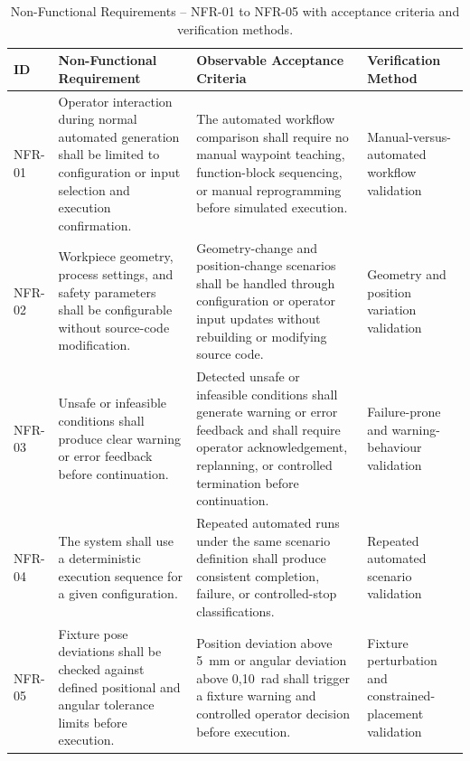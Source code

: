 ﻿\begin{table}[htbp]
\centering

\setlength{\tabcolsep}{3pt}
\renewcommand{\arraystretch}{1.0}

\begin{tabularx}{\textwidth}{
L{1.3cm}
L{5.8cm}
L{4.4cm}
L{3.1cm}
}

\hline
\textbf{ID} &
\textbf{Non-Functional Requirement} &
\textbf{Observable Acceptance Criteria} &
\textbf{Verification Method} \\
\hline

NFR-01 &
Operator interaction during normal automated generation shall be limited to configuration or input selection and execution confirmation. &
The automated workflow comparison shall require no manual waypoint teaching, function-block sequencing, or manual reprogramming before simulated execution. &
Manual-versus-automated workflow validation \\

\hline

NFR-02 &
Workpiece geometry, process settings, and safety parameters shall be configurable without source-code modification. &
Geometry-change and position-change scenarios shall be handled through configuration or operator input updates without rebuilding or modifying source code. &
Geometry and position variation validation \\

\hline

NFR-03 &
Unsafe or infeasible conditions shall produce clear warning or error feedback before continuation. &
Detected unsafe or infeasible conditions shall generate warning or error feedback and shall require operator acknowledgement, replanning, or controlled termination before continuation. &
Failure-prone and warning-behaviour validation \\

\hline

NFR-04 &
The system shall use a deterministic execution sequence for a given configuration. &
Repeated automated runs under the same scenario definition shall produce consistent completion, failure, or controlled-stop classifications. &
Repeated automated scenario validation \\

\hline

NFR-05 &
Fixture pose deviations shall be checked against defined positional and angular tolerance limits before execution. &
Position deviation above 5~mm or angular deviation above 0{,}10~rad shall trigger a fixture warning and controlled operator decision before execution. &
Fixture perturbation and constrained-placement validation \\

\hline
\end{tabularx}

\caption{Non-Functional Requirements -- NFR-01 to NFR-05 with acceptance criteria and verification methods.}
\label{tab:non-functional-requirements}
\end{table}
